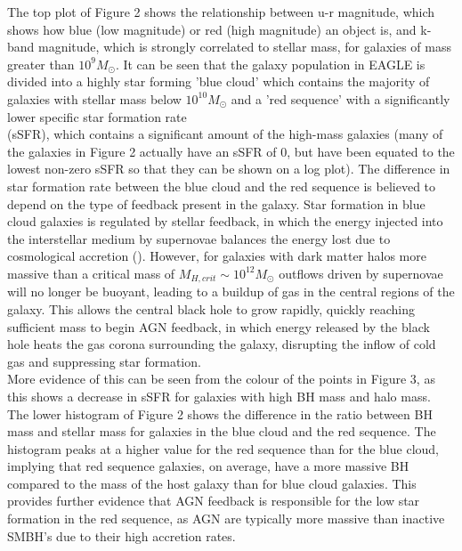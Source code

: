 \documentclass[12pt]{article}%
\begin{document}
The top plot of Figure 2 shows the relationship between u-r magnitude, which shows how blue (low magnitude) or red (high magnitude) an object is, and k-band magnitude, which is strongly correlated to stellar mass, for galaxies of mass greater than $10^9M_\odot$. It can be seen that the galaxy population in EAGLE is divided into a highly star forming 'blue cloud' which contains the majority of galaxies with stellar mass below $10^{10}M_\odot$ and a 'red sequence' with a significantly lower specific star formation rate\\(sSFR), which contains a significant amount of the high-mass galaxies (many of the galaxies in Figure 2 actually have an sSFR of 0, but have been equated to the lowest non-zero sSFR so that they can be shown on a log plot). The difference in star formation rate between the blue cloud and the red sequence is believed to depend on the type of feedback present in the galaxy. Star formation in blue cloud galaxies is regulated by  stellar feedback, in which the energy injected into the interstellar medium by supernovae balances the energy lost due to cosmological \hspace{2.5mm} accretion \hspace{2.5mm} (\cite{Ikea}). However, for galaxies with dark matter halos more massive than a critical mass of $M_{H,crit}\sim10^{12}M_\odot$ outflows driven by supernovae will no longer be buoyant, leading to a buildup of gas in the central regions of the galaxy. This allows the central black hole to grow rapidly, quickly reaching sufficient mass to begin AGN feedback, in which energy released by the black hole heats the gas corona surrounding the galaxy, disrupting the inflow of cold gas and suppressing star formation.\\More evidence of this can be seen from the colour of the points in Figure 3, as this shows a decrease in sSFR for galaxies with high BH mass and halo mass. The lower histogram of Figure 2 shows the difference in the ratio between BH mass and stellar mass for galaxies in the blue cloud and the red sequence. The histogram peaks at a higher value for the red sequence than for the blue cloud, implying that red sequence galaxies, on average, have a more massive BH compared to the mass of the host galaxy than for blue cloud galaxies. This provides further evidence that AGN feedback is responsible for the low star formation in the red sequence, as AGN are typically more massive than inactive SMBH's due to their high accretion rates.\par
\end{document}
